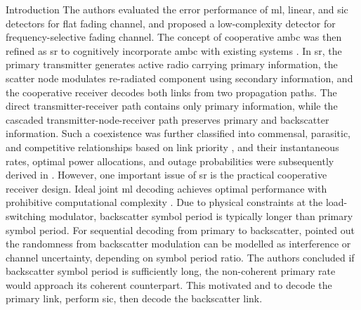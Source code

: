 \documentclass[journal]{IEEEtran}
\begin{document}
\begin{section}{Introduction}
	The authors evaluated the error performance of \gls{ml}, linear, and \gls{sic} detectors for flat fading channel, and proposed a low-complexity detector for frequency-selective fading channel.
	The concept of cooperative \gls{ambc} was then refined as \gls{sr} to cognitively incorporate \gls{ambc} with existing systems \cite{Liang2020}.
	In \gls{sr}, the primary transmitter generates active radio carrying primary information, the scatter node modulates re-radiated component using secondary information, and the cooperative receiver decodes both links from two propagation paths.
	The direct transmitter-receiver path contains only primary information, while the cascaded transmitter-node-receiver path preserves primary and backscatter information.
	Such a coexistence was further classified into commensal, parasitic, and competitive relationships based on link priority \cite{Guo2019b}, and their instantaneous rates, optimal power allocations, and outage probabilities were subsequently derived in \cite{Guo2019b,Ding2020}.
	However, one important issue of \gls{sr} is the practical cooperative receiver design.
	Ideal joint \gls{ml} decoding achieves optimal performance with prohibitive computational complexity \cite{Yang2018,Zhang2022}.
	Due to physical constraints at the load-switching modulator, backscatter symbol period is typically longer than primary symbol period.
	For sequential decoding from primary to backscatter, \cite{Long2020a} pointed out the randomness from backscatter modulation can be modelled as interference or channel uncertainty, depending on symbol period ratio.
	The authors concluded if backscatter symbol period is sufficiently long, the non-coherent primary rate would approach its coherent counterpart.
	This motivated \cite{Long2020a} and \cite{Ding2020,Zhou2019a,Wu2021a,Xu2021a,Yang2021a,Yang2018,Han2021,Zhang2022,Xu2020b,Hua2022} to decode the primary link, perform \gls{sic}, then decode the backscatter link.


\end{section}
\end{document}
